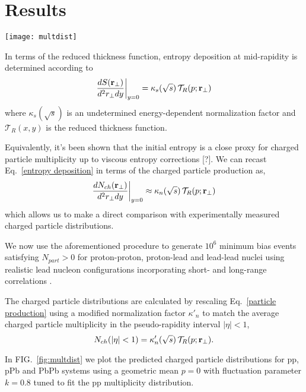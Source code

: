 \documentclass[aps,prl,reprint,amsmath,nofootinbib]{revtex4-1}
\begin{document}
\section{Results}

\begin{figure*}[t]
  \texttt{[image: multdist]}
  \caption{\label{fig:multdist}Minimum bias pp, pPb and PbPb charged particle distributions for power $p=0$,
  fluctuation parameter $k=0.8$ and normalization factor $\kappa'_n$ indicated in the legend.}
\end{figure*}

In terms of the reduced
thickness function, entropy deposition at mid-rapidity is determined according to
\begin{equation}
  \label{entropy deposition}
  \frac{dS({\bf r}_\perp)}{d^2r_\perp dy} \biggr \rvert_{y=0} = \kappa_s(\sqrt{s})\, \mathcal{T}_R(p;{\bf r}_\perp)
\end{equation}
where $\kappa_s(\sqrt{s})$ is an undetermined energy-dependent normalization factor and $\mathcal{T}_R(x,y)$
is the reduced thickness function.

Equivalently, it's been shown that the initial entropy is a close proxy for charged particle multiplicity up
to viscous entropy corrections [?]. We can recast Eq.~\eqref{entropy deposition} in terms of the charged
particle production as,
\begin{equation}
  \label{particle production}
  \frac{dN_{ch}({\bf r}_\perp)}{d^2r_\perp dy} \biggr \rvert_{y=0} \approx
  \kappa_n(\sqrt{s})\, \mathcal{T}_R(p;{\bf r}_\perp)
\end{equation}
which allows us to make a direct comparison with experimentally measured charged particle distributions.

We now use the aforementioned procedure to generate $10^6$ minimum bias events satisfying $N_{part} > 0$ for
proton-proton, proton-lead and lead-lead nuclei using realistic lead nucleon configurations incorporating
short- and long-range correlations \cite{nucleon-correlations}.

The charged particle distributions are calculated by rescaling Eq.~\eqref{particle production} using a
modified normalization factor $\kappa'_n$ to match the average charged particle multiplicity in the
pseudo-rapidity interval $|\eta| < 1$,
\begin{equation}
  N_{ch}(|\eta|<1) = \kappa'_n(\sqrt{s})\, \mathcal{T}_R(p;{\bf r}_\perp).
\end{equation}

In FIG.~\ref{fig:multdist} we plot the predicted charged particle distributions for pp, pPb and PbPb systems
using a geometric mean $p=0$ with fluctuation parameter $k=0.8$ tuned to fit the pp multiplicity
distribution.
\end{document}
